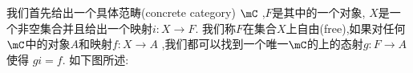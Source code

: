 \begin{definition}[][自由对象]
    我们首先给出一个具体范畴(concrete category) $\mC$ ,$F$是其中的一个对象, $X$是一个非空集合并且给出一个映射$i\colon X\to F$.  我们称$F$在集合$X$上自由(free),如果对任何$\mC$中的对象$A$和映射$f\colon X\to A$ ,我们都可以找到一个唯一$\mC$的上的态射$g\colon F\to A$使得 $gi=f$. 如下图所述:
    \vspace{-\baselineskip}
    \begin{center}
    \end{center}
\end{definition}

